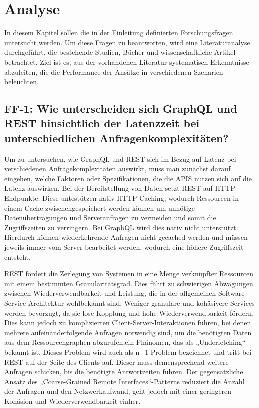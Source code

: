 \chapter{Analyse} %
\label{sec:analyse}
In diesem Kapitel sollen die in der Einleitung definierten Forschungsfragen untersucht werden. Um diese Fragen zu beantworten, wird eine Literaturanalyse durchgeführt, die bestehende Studien, Bücher und wissenschaftliche Artikel betrachtet. Ziel ist es, aus der vorhandenen Literatur systematisch Erkenntnisse abzuleiten, die die Performance der Ansätze in verschiedenen Szenarien beleuchten.

\section{FF-1: Wie unterscheiden sich GraphQL und REST hinsichtlich der Latenzzeit bei unterschiedlichen Anfragenkomplexitäten?} %
\label{sec:ff1}
Um zu untersuchen, wie GraphQL und REST sich im Bezug auf Latenz bei verschiedenen Anfragekomplexitäten auswirkt, muss man zunächst darauf eingehen, welche Faktoren oder Spezifikationen, die die APIS nutzen sich auf die Latenz auswirken.
Bei der Bereitstellung von Daten setzt REST auf HTTP-Endpunkte. Diese untestützen nativ HTTP-Caching,  wodurch Ressourcen in einem Cache zwischengespeichert werden können um unnötige Datenübertragungen und Serveranfragen zu vermeiden und somit die Zugriffszeiten zu verringern.
Bei GraphQL wird dies nativ nicht unterstützt. Hierdurch können wiederkehrende Anfragen nicht gecached werden und müssen jeweils immer vom Server bearbeitet werden, wodurch eine höhere Zugriffszeit entsteht. \citep{graphqlreplacerest}

\noindent
REST fördert die Zerlegung von Systemen in eine Menge verknüpfter Ressourcen mit einem bestimmten Granularitätsgrad. Dies führt zu schwierigen Abwägungen zwischen Wiederverwendbarkeit und Leistung, die in der allgemeinen Software-Service-Architektur wohlbekannt sind. Weniger granulare und kohäsivere Services werden bevorzugt, da sie lose Kopplung und hohe Wiederverwendbarkeit fördern. Dies kann jedoch zu komplizierten Client-Server-Interaktionen führen, bei denen mehrere aufeinanderfolgende Anfragen notwendig sind, um die benötigten Daten aus dem Ressourcengraphen abzurufen,ein Phänomen, das als „Underfetching“ bekannt ist. Dieses Problem wird auch als n+1-Problem bezeichnet und tritt bei REST auf der Seite des Clients auf. Dieser muss demensprechend weitere Anfragen schicken, bis die benötigte Antwortzeiten führen. Der gegensätzliche Ansatz des „Coarse-Grained Remote Interfaces“-Patterns reduziert die Anzahl der Anfragen und den Netzwerkaufwand, geht jedoch mit einer geringeren Kohäsion und Wiederverwendbarkeit einher.\citep{graphqlhealth} \citep{migrategraphql}


